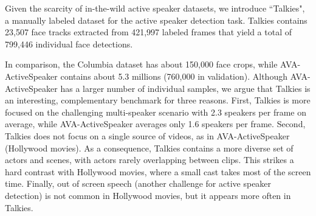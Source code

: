 \documentclass[10pt,twocolumn,letterpaper]{article}
\begin{document}
Given the scarcity of in-the-wild active speaker datasets, we introduce ``Talkies", a manually labeled dataset for the active speaker detection task. Talkies contains 23,507 face tracks extracted from 421,997 labeled frames that yield a total of 799,446 individual face detections.

In comparison, the Columbia dataset \cite{chakravarty2016active} has about 150,000 face crops, while AVA-ActiveSpeaker \cite{roth2019ava} contains about 5.3 millions (760,000 in validation). Although AVA-ActiveSpeaker has a larger number of individual samples, we argue that Talkies is an interesting, complementary benchmark for three reasons. First, Talkies is more focused on the challenging multi-speaker scenario with 2.3 speakers per frame on average, while AVA-ActiveSpeaker averages only 1.6 speakers per frame. Second, Talkies does not focus on a single source of videos, as in AVA-ActiveSpeaker (Hollywood movies). As a consequence, Talkies contains a more diverse set of actors and scenes, with actors rarely overlapping between clips. This strikes a hard contrast with Hollywood movies, where a small cast takes most of the screen time. Finally, out of screen speech (another challenge for active speaker detection) is not common in Hollywood movies, but it appears more often in Talkies. 
\end{document}
